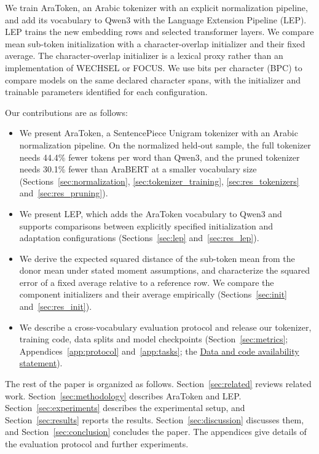 \documentclass{ieeeaccess}
\begin{document}
We train AraToken, an Arabic tokenizer with an explicit normalization
pipeline, and add its vocabulary to Qwen3 \cite{qwen3technicalreport}
with the Language Extension Pipeline (LEP). LEP trains the new embedding
rows and selected transformer layers. We compare mean sub-token
initialization with a character-overlap initializer and their fixed average.
The character-overlap initializer is a lexical proxy rather than an
implementation of WECHSEL or FOCUS. We use bits per character (BPC) to
compare models on the same declared character spans, with the initializer
and trainable parameters identified for each configuration.

Our contributions are as follows:
\begin{itemize}
\item We present AraToken, a SentencePiece Unigram tokenizer with an Arabic
normalization pipeline. On the normalized held-out sample, the full tokenizer
needs 44.4\% fewer tokens per word than Qwen3, and the pruned tokenizer needs
30.1\% fewer than AraBERT at a smaller vocabulary size
(Sections~\ref{sec:normalization}, \ref{sec:tokenizer_training},
\ref{sec:res_tokenizers} and~\ref{sec:res_pruning}).
\item We present LEP, which adds the AraToken vocabulary to Qwen3 and supports
comparisons between explicitly specified initialization and adaptation
configurations (Sections~\ref{sec:lep} and~\ref{sec:res_lep}).
\item We derive the expected squared distance of the sub-token mean from the
donor mean under stated moment assumptions, and characterize the squared
error of a fixed average relative to a reference row. We compare the
component initializers and their average empirically
(Sections~\ref{sec:init} and~\ref{sec:res_init}).
\item We describe a cross-vocabulary evaluation protocol and release
our tokenizer, training code, data splits and model checkpoints
(Section~\ref{sec:metrics}; Appendices~\ref{app:protocol} and~\ref{app:tasks};
the \hyperref[sec:availability]{Data and code availability statement}).
\end{itemize}

The rest of the paper is organized as follows. Section~\ref{sec:related}
reviews related work. Section~\ref{sec:methodology} describes AraToken and
LEP. Section~\ref{sec:experiments} describes the experimental setup, and
Section~\ref{sec:results} reports the results.
Section~\ref{sec:discussion} discusses them, and Section~\ref{sec:conclusion}
concludes the paper. The appendices give details of the evaluation protocol
and further experiments.
\end{document}
